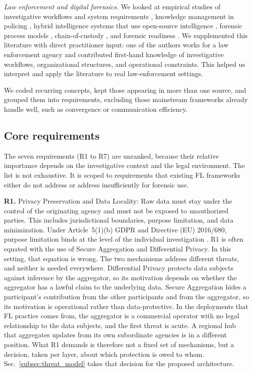 \textit{Law enforcement and digital forensics.} We looked at empirical studies of investigative workflows and system requirements \citep{SKIPANES2026100805}, knowledge management in policing \citep{GOTTSCHALK201094}, hybrid intelligence systems that use open-source intelligence \citep{Maio2025HybridOSINT}, forensic process models \citep{carrier2003defining, palmer2001road}, chain-of-custody \citep{casey2011}, and forensic readiness \citep{rowlingson2004ten}. We supplemented this literature with direct practitioner input: one of the authors works for a law enforcement agency and contributed first-hand knowledge of investigative workflows, organizational structures, and operational constraints. This helped us interpret and apply the literature to real law-enforcement settings.

We coded recurring concepts, kept those appearing in more than one source, and grouped them into requirements, excluding those mainstream frameworks already handle well, such as convergence or communication efficiency.



\subsection{Core requirements}

The seven requirements (R1 to R7) are unranked, because their relative importance depends on the investigative context and the legal environment. The list is not exhaustive. It is scoped to requirements that existing FL frameworks either do not address or address insufficiently for forensic use.

\textbf{R1.} Privacy Preservation and Data Locality:
Raw data must stay under the control of the originating agency and must not be exposed to unauthorized parties. This includes jurisdictional boundaries, purpose limitation, and data minimization. Under Article~5(1)(b) GDPR and Directive (EU) 2016/680, purpose limitation binds at the level of the individual investigation \citep{gdpr_article5,directive2016680}.
%
R1 is often equated with the use of Secure Aggregation and Differential Privacy. In this setting, that equation is wrong. The two mechanisms address different threats, and neither is needed everywhere. Differential Privacy protects data subjects against inference by the aggregator, so its motivation depends on whether the aggregator has a lawful claim to the underlying data. Secure Aggregation hides a participant's contribution from the other participants and from the aggregator, so its motivation is operational rather than data-protective. In the deployments that FL practice comes from, the aggregator is a commercial operator with no legal relationship to the data subjects, and the first threat is acute. A regional hub that aggregates updates from its own subordinate agencies is in a different position. What R1 demands is therefore not a fixed set of mechanisms, but a decision, taken per layer, about which protection is owed to whom. Sec.~\ref{subsec:threat_model} takes that decision for the proposed architecture.


